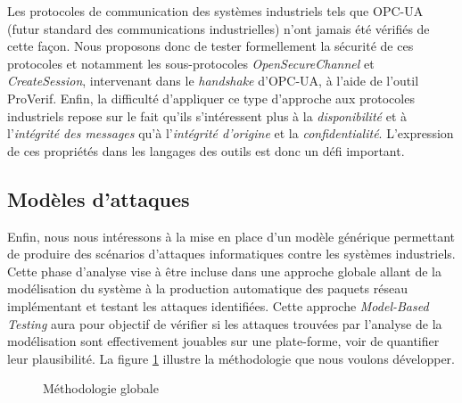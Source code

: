 \documentclass{article}
\newcommand{\proverif}{ProVerif\xspace}
\newcommand{\opcua}{OPC-UA\xspace}
\begin{document}
Les protocoles de communication des systèmes industriels tels que
\opcua~\cite{MLD09} (futur standard des communications industrielles) n'ont
jamais été vérifiés de cette façon.
Nous proposons donc de tester formellement la sécurité de ces protocoles et
notamment les sous-protocoles {\em OpenSecureChannel} et {\em CreateSession},
intervenant dans le {\em handshake} d'\opcua, à l'aide de l'outil \proverif.
Enfin, la difficulté d'appliquer ce type d'approche aux protocoles industriels
repose sur le fait qu'ils s'intéressent plus à la {\em disponibilité} et à 
l'{\em intégrité des messages} qu'à l'{\em intégrité d'origine} et la
{\em confidentialité}.
L'expression de ces propriétés dans les langages des outils est donc un défi
important.

\subsection{Modèles d'attaques}\label{sec:models}


Enfin, nous nous intéressons à la mise en place d'un modèle générique permettant
de produire des scénarios d'attaques informatiques contre les systèmes industriels.
Cette phase d'analyse vise à être incluse dans une approche globale allant de la
modélisation du système à la production automatique des paquets réseau
implémentant et testant les attaques identifiées.
Cette approche {\em Model-Based Testing} aura pour objectif de vérifier si les
attaques trouvées par l'analyse de la modélisation sont  effectivement jouables
sur une plate-forme, voir de quantifier leur plausibilité.
La figure \ref{fig:metho} illustre la méthodologie que nous voulons développer.

\begin{figure}[htb]
    \centering
    \resizebox{.75\textwidth}{!}{
        
    }
    \caption{Méthodologie globale}
    \label{fig:metho}
\end{figure}
\end{document}

